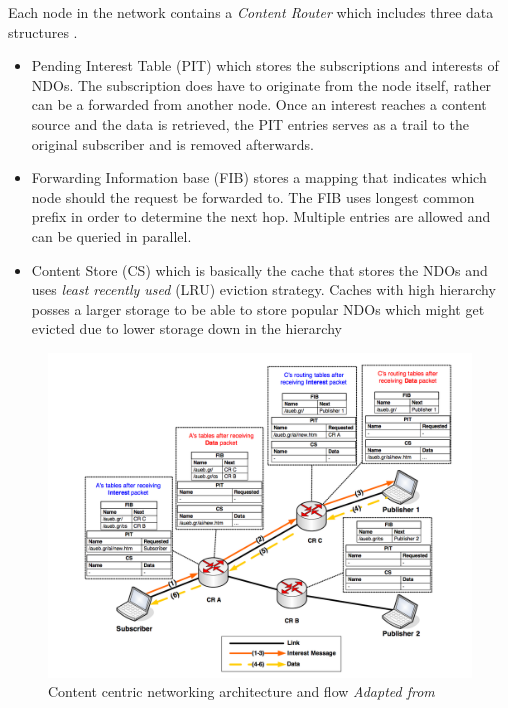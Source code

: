 Each node in the network contains a \textit{Content Router} which includes three data structures \cite{6563278}\cite{6231276}. 
\begin{itemize}
\item Pending Interest Table (PIT) which stores the subscriptions and interests of NDOs. The subscription does have to originate  from the node itself, rather can be a forwarded from another node. Once an interest reaches a content source and the data is retrieved, the PIT entries serves as a trail to the original subscriber and is removed afterwards.

\item Forwarding Information base (FIB)  stores a mapping that indicates which node should the request be forwarded to. The FIB uses longest common prefix in order to determine the next hop. Multiple entries are allowed and can be queried in parallel.
\item Content Store (CS) which is basically the cache that stores the NDOs and uses \textit{least recently used} (LRU) eviction strategy. Caches with high hierarchy posses a larger storage to be able to store popular NDOs which might get evicted due to  lower storage down in the hierarchy
\end{itemize}  

\begin{figure}[H]
	\centering
	\includegraphics[scale=0.4]{images/ccn2.png}
	\caption{Content centric networking architecture and flow \textit{Adapted from \cite{6563278}}}
	\label{fig:ccn}
\end{figure}

